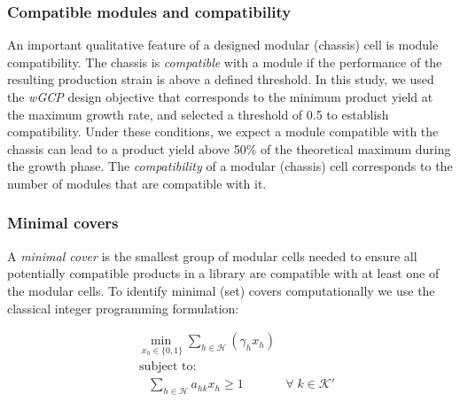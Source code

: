 {\subsubsection{Compatible modules and compatibility}
An important qualitative feature of a designed modular (chassis) cell is module compatibility.
The chassis is \emph{compatible} with a module if the performance of the resulting production strain is above a defined threshold.
In this study, we used the \textit{wGCP} design objective that corresponds to the minimum product yield at the maximum growth rate,\citep{garcia2019} and selected a threshold of 0.5 to establish compatibility. Under these conditions, we expect a module compatible with the chassis can lead to a product yield above 50\% of the theoretical maximum during the growth phase.
The \emph{compatibility} of a modular (chassis) cell corresponds to the number of modules that are compatible with it.

\subsubsection{Minimal covers} \label{sec:minimal_covers}
A \emph{minimal cover} is the smallest group of modular cells needed to ensure all potentially compatible products in a library are compatible with at least one of the modular cells.
To identify minimal (set) covers computationally we use the classical integer programming formulation:

\begin{align}
    & \underset{ \;x_h \in \{0,1\}}{\min} \sum_{h \in \mathcal{H}} ( \gamma_h x_h) \label{eq7:mc_1}\\
    & \nonumber \; \text{subject to:} \\
    & \quad \sum_{h \in \mathcal{H}} a_{hk} x_h \ge 1 & \forall \; k \in \mathcal{K'} \label{eq7:mc_2}%
\end{align}

}
